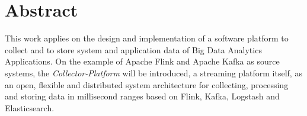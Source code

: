 \chapter*{Abstract}

This work applies on the design and implementation of a software platform to
collect and to store system and application data of Big Data Analytics Applications.
On the example of Apache Flink and Apache Kafka as source systems, the \textit{Collector-Platform} will
be introduced, a streaming platform itself, as an open, flexible and distributed system architecture for collecting,
processing and storing data in millisecond ranges based on Flink, Kafka, Logstash and Elasticsearch.

